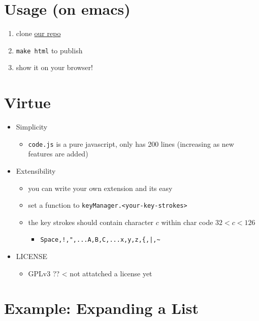 \section{Usage (on emacs)}
\label{sec-3}

\begin{enumerate}
\item clone \href{https://github.com/guicho271828/another-org-info}{our repo}

\item \texttt{make html} to publish

\item show it on your browser!
\end{enumerate}

\section{Virtue}
\label{sec-4}

\begin{itemize}
\item Simplicity
\begin{itemize}
\item \texttt{code.js} is a pure javascript, only has 200 lines (increasing as new features
are added)
\end{itemize}
\item Extensibility
\begin{itemize}
\item you can write your own extension and its easy
\item set a function to \texttt{keyManager.<your-key-strokes>}
\item the key strokes should contain character \(c\) within char code \(32 < c < 126\)
\begin{itemize}
\item \texttt{Space,!,",...A,B,C,...x,y,z,\{,|,\textasciitilde{}}
\end{itemize}
\end{itemize}
\item LICENSE
\begin{itemize}
\item GPLv3 ?? < not attatched a license yet
\end{itemize}
\end{itemize}

\section{Example: Expanding a List}
\label{sec-5}

